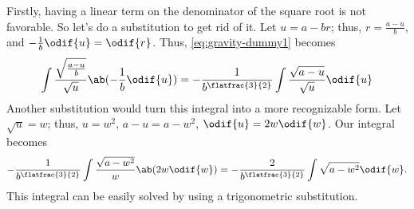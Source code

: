 Firstly, having a linear term on the denominator of the square root is not favorable. So let's do a substitution to get rid of it. Let $u = a - br$; thus, $r = \frac{a - u}{b}$, and $-\frac{1}{b}\odif{u} = \odif{r}$. Thus, \cref{eq:gravity-dummy1} becomes
\begin{equation}
	\int\frac{\sqrt{\frac{a - u}{b}}}{\sqrt{u}}\ab(-\frac{1}{b}\odif{u}) = -\frac{1}{b^{\flatfrac{3}{2}}}\int\frac{\sqrt{a - u}}{\sqrt{u}}\odif{u}
\end{equation}
Another substitution would turn this integral into a more recognizable form. Let $\sqrt{u} = w$; thus, $u = w^2$, $a - u = a - w^2$, $\odif{u} = 2w\odif{w}$. Our integral becomes
\begin{align}
	-\frac{1}{b^{\flatfrac{3}{2}}}\int\frac{\sqrt{a - w^2}}{w}\ab(2w\odif{w}) = -\frac{2}{b^{\flatfrac{3}{2}}}\int\sqrt{a - w^2}\odif{w}.
\end{align}
This integral can be easily solved by using a trigonometric substitution.

